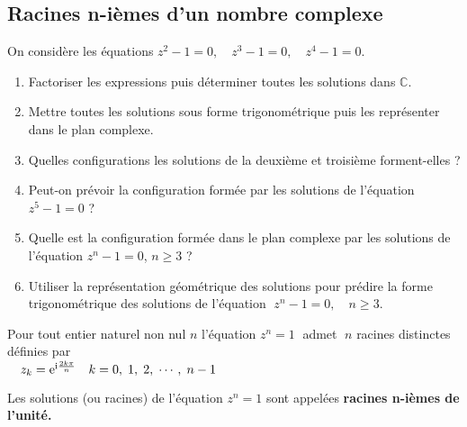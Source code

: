 \subsection{ Racines n-ièmes d'un nombre complexe}
\begin{lemma}
On considère les équations \; $ z^2-1=0,\quad  z^3-1=0 ,\quad  z^4-1=0 $.
\begin{enumerate}
\item Factoriser les expressions puis déterminer toutes les solutions dans $ \mathbb{C} $.
\item Mettre  toutes les solutions sous forme trigonométrique  puis les représenter dans le plan complexe.
\item Quelles configurations les solutions de la deuxième et troisième forment-elles ?
\item Peut-on prévoir la configuration formée par les solutions de l'équation   \; $ z^5-1=0 $ ?
\item Quelle est la  configuration formée dans le plan complexe par les solutions de l'équation   \; $ z^n-1=0 $, \quad $ n\geq 3 $ ?
\item  Utiliser la représentation géométrique des solutions  pour prédire la forme trigonométrique des solutions de l'équation    $ \;z^n-1=0 , \quad  n\geq 3 $.
\end{enumerate}
\end{lemma}


\begin{theorem}
Pour tout entier naturel  non nul $ n $ l'équation  $ z^n=1 \;$ admet  $\;  n $ racines   distinctes  définies par
\\$\quad  z_k=\mathrm{e}^{\text{i}\frac{2k\pi}{n} }\quad k=0, \; 1, \; 2 ,\; \cdots, \;n-1$

\medskip

Les solutions (ou racines) de l'équation $ z^n=1 $ sont appelées  \textbf{racines n-ièmes de l'unité.}

\end{theorem}


